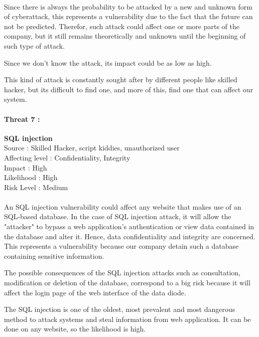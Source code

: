\documentclass[a4paper,10pt]{article}
\begin{document}
\paragraph{}Since there is always the probability to be attacked by a new and unknown form of cyberattack, this represents a vulnerability due to the fact that the future can not be predicted. Therefor, such attack could affect one or more parts of the company, but it still remains theoretically and unknown until the beginning of such type of attack.

Since we don't know the attack, its impact could be as low as high.

This kind of attack is constantly sought after by different people like skilled hacker, but its difficult to find one, and more of this, find one that can affect our system. \\

\paragraph{Threat 7 :}  \textbf{SQL injection} \\ 
Source : Skilled Hacker, script kiddies, unauthorized user \\ 
Affecting level : Confidentiality, Integrity \\
Impact : High \\
Likelihood : High \\
Risk Level : Medium
\paragraph{}An SQL injection vulnerability could affect any website that makes use of an SQL-based database.
In the case of SQL injection attack, it will allow the "attacker" to bypass a web application's authentication or view data contained in the database and alter it. Hence, data confidentiality and integrity are concerned. This represents a vulnerability because our company detain such a database containing sensitive information.

The possible consequences of the SQL injection attacks such as consultation, modification or deletion of the database, correspond to a big risk because it will affect the login page of the web interface of the data diode. 

The SQL injection is one of the oldest, most prevalent and most dangerous method to attack systems and steal information from web application. It can be done on any website, so the likelihood is high.\\
\end{document}
